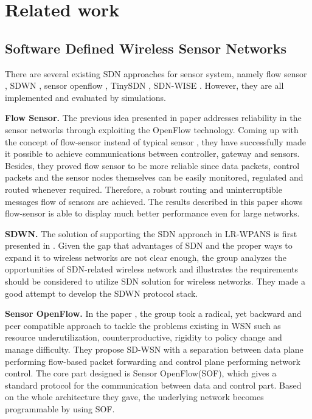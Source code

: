 \section{Related work}

\subsection{Software Defined Wireless Sensor Networks}


There are several existing SDN approaches for sensor system, 
namely flow sensor \cite{mahmud2011exploitation}, SDWN \cite{costanzo2012software},
sensor openflow \cite{luo2012sensor}, TinySDN \cite{de2015tinysdn}, SDN-WISE \cite{galluccio2015sdn}.
However, they are all implemented and evaluated by simulations. 

\textbf{Flow Sensor.}
The previous idea presented in paper \cite{mahmud2011exploitation} addresses 
reliability in the sensor networks through exploiting the OpenFlow technology\cite{Mckeown2008OpenFlow}. 
Coming up with the concept of flow-sensor instead of typical sensor \cite{Liu2015Thermoresistive}, 
they have successfully made it possible to achieve communications between controller, 
gateway and sensors. Besides, they proved flow sensor to be more 
reliable since data packets, control packets and the sensor nodes 
themselves can be easily monitored, regulated and routed whenever 
required. Therefore, a robust routing and uninterruptible messages 
flow of sensors are achieved. The results described in this paper 
shows flow-sensor is able to display much better performance even for large networks.

\textbf{SDWN.}
The solution of supporting the SDN approach in LR-WPANS is first presented in \cite{costanzo2012software}. 
Given the gap that advantages of SDN and the proper ways to expand it to wireless networks are not clear enough, 
the group analyzes the opportunities of SDN-related wireless network and illustrates 
the requirements should be considered to utilize SDN solution for wireless networks. 
They made a good attempt to develop the SDWN protocol stack.

\textbf{Sensor OpenFlow.}
In the paper \cite{luo2012sensor}, the group took a radical, yet backward 
and peer compatible approach to tackle the problems existing in WSN 
such as resource underutilization, counterproductive, rigidity to policy 
change and manage difficulty. They propose SD-WSN with a separation between 
data plane performing flow-based packet forwarding and control plane performing network control. 
The core part designed is Sensor OpenFlow(SOF), which gives a standard protocol for the communication 
between data and control part. Based on the whole architecture they gave, 
the underlying network becomes programmable by using SOF.

